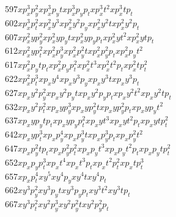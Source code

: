 \begin{tabbing}
597\>$x  p_x^3 p_y^2    $\>$x  p_x^3 p_yt     $\>$x  p_x^3 p_yp_t   $\>$x  p_x^3 t  ^2    $\>$x  p_x^3 t  p_t   $\\
602\>$x  p_x^3 p_t^2    $\>$x  p_x^2 y  ^3    $\>$x  p_x^2 y  ^2 p_y$\>$x  p_x^2 y  ^2 t  $\>$x  p_x^2 y  ^2 p_t$\\
607\>$x  p_x^2 y  p_y^2 $\>$x  p_x^2 y  p_yt  $\>$x  p_x^2 y  p_yp_t$\>$x  p_x^2 y  t  ^2 $\>$x  p_x^2 y  t  p_t$\\
612\>$x  p_x^2 y  p_t^2 $\>$x  p_x^2 p_y^3    $\>$x  p_x^2 p_y^2 t  $\>$x  p_x^2 p_y^2 p_t$\>$x  p_x^2 p_yt  ^2 $\\
617\>$x  p_x^2 p_yt  p_t$\>$x  p_x^2 p_yp_t^2 $\>$x  p_x^2 t  ^3    $\>$x  p_x^2 t  ^2 p_t$\>$x  p_x^2 t  p_t^2 $\\
622\>$x  p_x^2 p_t^3    $\>$x  p_xy  ^4       $\>$x  p_xy  ^3 p_y   $\>$x  p_xy  ^3 t     $\>$x  p_xy  ^3 p_t   $\\
627\>$x  p_xy  ^2 p_y^2 $\>$x  p_xy  ^2 p_yt  $\>$x  p_xy  ^2 p_yp_t$\>$x  p_xy  ^2 t  ^2 $\>$x  p_xy  ^2 t  p_t$\\
632\>$x  p_xy  ^2 p_t^2 $\>$x  p_xy  p_y^3    $\>$x  p_xy  p_y^2 t  $\>$x  p_xy  p_y^2 p_t$\>$x  p_xy  p_yt  ^2 $\\
637\>$x  p_xy  p_yt  p_t$\>$x  p_xy  p_yp_t^2 $\>$x  p_xy  t  ^3    $\>$x  p_xy  t  ^2 p_t$\>$x  p_xy  t  p_t^2 $\\
642\>$x  p_xy  p_t^3    $\>$x  p_xp_y^4       $\>$x  p_xp_y^3 t     $\>$x  p_xp_y^3 p_t   $\>$x  p_xp_y^2 t  ^2 $\\
647\>$x  p_xp_y^2 t  p_t$\>$x  p_xp_y^2 p_t^2 $\>$x  p_xp_yt  ^3    $\>$x  p_xp_yt  ^2 p_t$\>$x  p_xp_yt  p_t^2 $\\
652\>$x  p_xp_yp_t^3    $\>$x  p_xt  ^4       $\>$x  p_xt  ^3 p_t   $\>$x  p_xt  ^2 p_t^2 $\>$x  p_xt  p_t^3    $\\
657\>$x  p_xp_t^4       $\>$x  y  ^5          $\>$x  y  ^4 p_y      $\>$x  y  ^4 t        $\>$x  y  ^4 p_t      $\\
662\>$x  y  ^3 p_y^2    $\>$x  y  ^3 p_yt     $\>$x  y  ^3 p_yp_t   $\>$x  y  ^3 t  ^2    $\>$x  y  ^3 t  p_t   $\\
667\>$x  y  ^3 p_t^2    $\>$x  y  ^2 p_y^3    $\>$x  y  ^2 p_y^2 t  $\>$x  y  ^2 p_y^2 p_t$\>

\end{tabbing}
